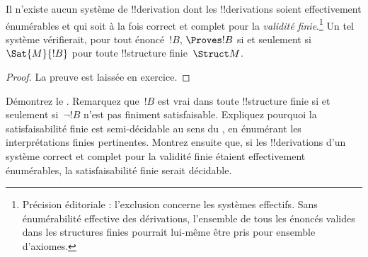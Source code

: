 \documentclass[../../../include/open-logic-section]{subfiles}
\begin{document}
\begin{cor}%
Il n'existe aucun système de !!{derivation} dont les
!!{derivation}s soient effectivement énumérables et qui soit
à la fois correct et complet pour la \emph{validité finie}.\footnote{Précision éditoriale : l'exclusion concerne les systèmes effectifs. Sans énumérabilité effective des dérivations, l'ensemble de tous les énoncés valides dans les structures finies pourrait lui-même être pris pour ensemble d'axiomes.}
Un tel système vérifierait, pour tout énoncé~$!B$,
$\Proves !B$ si et seulement si
$\Sat{M}{!B}$ pour toute !!{structure} finie~$\Struct M$.
\end{cor}

\begin{proof}
La preuve est laissée en exercice.
\end{proof}

\begin{prob}
Démontrez le .
Remarquez que~$!B$ est vrai dans toute !!{structure} finie
si et seulement si~$\lnot !B$ n'est pas finiment satisfaisable.
Expliquez pourquoi la satisfaisabilité finie est semi-décidable
au sens du , en énumérant
les interprétations finies pertinentes. Montrez ensuite que,
si les !!{derivation}s d'un système correct et complet pour
la validité finie étaient effectivement énumérables, la
satisfaisabilité finie serait décidable.
\end{prob}
\end{document}
